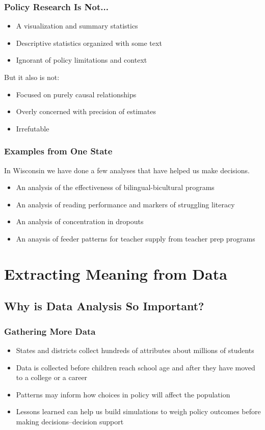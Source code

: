 \documentclass[12pt,handout]{beamer}
\begin{document}
\begin{frame}
\frametitle{Policy Research Is Not...}
  \begin{itemize}
  \item A visualization and summary statistics
  \item Descriptive statistics organized with some text
  \item Ignorant of policy limitations and context
  \end{itemize}
\begin{center}
But it also is not:
\end{center}
  \begin{itemize}
    \item Focused on purely causal relationships
    \item Overly concerned with precision of estimates
    \item Irrefutable 
  \end{itemize}
\end{frame}

\begin{frame}
\frametitle{Examples from One State}
  In Wisconsin we have done a few analyses that have helped us make decisions. 
  \begin{itemize}
  \item An analysis of the effectiveness of bilingual-bicultural programs
  \pause
  \item An analysis of reading performance and markers of struggling literacy
  \pause
  \item An analysis of concentration in dropouts
  \pause
  \item An anaysis of feeder patterns for teacher supply from teacher prep programs
  \end{itemize}
\end{frame}


\section{Extracting Meaning from Data}
\label{sec:extrct-meaning}

\subsection{Why is Data Analysis So Important?}
\begin{frame}
\frametitle{Gathering More Data}
\begin{itemize}
  \item States and districts collect hundreds of attributes about millions of students
  \item Data is collected before children reach school age and after they have moved to a college or a career
  \item Patterns may inform how choices in policy will affect the population
  \item Lessons learned can help us build simulations to weigh policy outcomes before making decisions--decision support
\end{itemize}
\end{frame}
\end{document}
